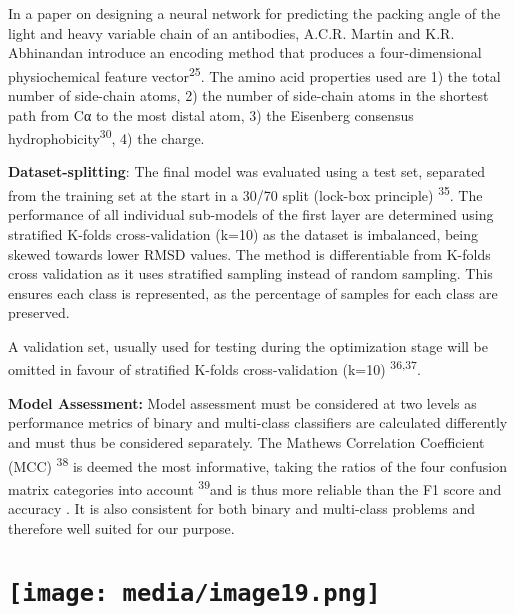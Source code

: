 \documentclass[
]{article}
\begin{document}
In a paper on designing a neural network for predicting the packing
angle of the light and heavy variable chain of an antibodies, A.C.R.
Martin and K.R. Abhinandan introduce an encoding method that produces a
four-dimensional physiochemical feature vector\textsuperscript{25}. The
amino acid properties used are 1) the total number of side-chain atoms,
2) the number of side-chain atoms in the shortest path from Cα to the
most distal atom, 3) the Eisenberg consensus
hydrophobicity\textsuperscript{30}, 4) the charge.

\textbf{Dataset-splitting}: The final model was evaluated using a test
set, separated from the training set at the start in a 30/70 split
(lock-box principle) \textsuperscript{35}. The performance of all
individual sub-models of the first layer are determined using stratified
K-folds cross-validation (k=10) as the dataset is imbalanced, being
skewed towards lower RMSD values. The method is differentiable from
K-folds cross validation as it uses stratified sampling instead of
random sampling. This ensures each class is represented, as the
percentage of samples for each class are preserved.

A validation set, usually used for testing during the optimization stage
will be omitted in favour of stratified K-folds cross-validation (k=10)
\textsuperscript{36,37}.

\textbf{Model Assessment:} Model assessment must be considered at two
levels as performance metrics of binary and multi-class classifiers are
calculated differently and must thus be considered separately. The
Mathews Correlation Coefficient (MCC) \textsuperscript{38} is deemed the
most informative, taking the ratios of the four confusion matrix
categories into account \textsuperscript{39}and is thus more reliable
than the F1 score and accuracy . It is also consistent for both binary
and multi-class problems and therefore well suited for our purpose.

\hypertarget{section-3}{%
\section{}\label{section-3}}

\hypertarget{section-4}{%
\section{\texorpdfstring{\protect\texttt{[image: media/image19.png]}}{}}\label{section-4}}
\end{document}
